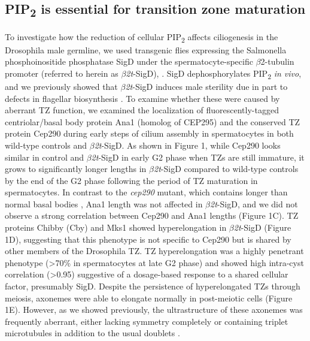 \documentclass[12pt, twoside, letterpaper]{article}
\newcommand{\PIP}{PIP\textsubscript{2}}
\newcommand{\sigd}{$\beta$\textit{2t}-SigD}
\begin{document}
\begin{doublespacing}
\begin{linenumbers}
    \subsection{\PIP{} is essential for transition zone maturation}
    To investigate how the reduction of cellular \PIP{} affects ciliogenesis in the
    Drosophila male germline,
    we used transgenic flies expressing the Salmonella phosphoinositide phosphatase SigD
    under the spermatocyte-specific $\beta$2-tubulin promoter (referred to herein as \sigd{}),
    \citep{wei2008depletion, fabian2010phosphatidylinositol}.
    SigD dephosphorylates \PIP{} \textit{in vivo},
    and we previously showed that \sigd{} induces male sterility
    due in part to defects in flagellar biosynthesis \citep{wei2008depletion}.
    To examine whether these were caused by aberrant TZ function,
    we examined the localization of fluorescently-tagged
    centriolar/basal body protein
    Ana1 (homolog of CEP295) \citep{goshima2007genes, blachon2009proximal}
    and the conserved TZ protein Cep290 \citep{basiri2014migrating}
    during early steps of cilium assembly in spermatocytes in both
    wild-type controls and \sigd{}.
    As shown in Figure 1,
    while Cep290 looks similar in control and \sigd{} in early G2 phase
    when TZs are still immature, 
    it grows to significantly longer lengths in \sigd{}
    compared to wild-type controls by the end of the G2 phase following
    the period of TZ maturation in spermatocytes.
    In contrast to the \textit{cep290} mutant, which contains
    longer than normal basal bodies \citep{basiri2014migrating},
    Ana1 length was not affected in \sigd{},
    and we did not observe a strong
    correlation between Cep290 and Ana1 lengths (Figure 1C).
    TZ proteins Chibby (Cby) \citep{enjolras2012drosophila} and
    Mks1 \citep{vieillard2016transition}
    showed hyperelongation in \sigd{} (Figure 1D),
    suggesting that this phenotype is not specific to Cep290 but is shared
    by other members of the Drosophila TZ.
    TZ hyperelongation was a highly penetrant phenotype (\textgreater 70\%
    in spermatocytes at late G2 phase)
    and showed high intra-cyst correlation (\textgreater 0.95) suggestive
    of a dosage-based response to a shared cellular factor,
    presumably SigD.
    Despite the persistence of hyperelongated TZs through meiosis,
    axonemes were able to
    elongate normally in post-meiotic cells (Figure 1E).
    However, as we showed previously, the ultrastructure of these axonemes
    was frequently aberrant,
    either lacking symmetry completely or containing triplet microtubules
    in addition to the usual doublets \citep{wei2008depletion}.


\end{linenumbers}
\end{doublespacing}
\end{document}
